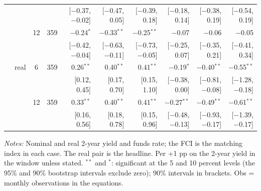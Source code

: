 \begin{longtable}{llcrrrrrrr}
 & & & & {\scriptsize [$-$0.37, $-$0.02]} & {\scriptsize [$-$0.47, 0.05]} & {\scriptsize [$-$0.39, 0.18]} & {\scriptsize [$-$0.18, 0.14]} & {\scriptsize [$-$0.38, 0.19]} & {\scriptsize [$-$0.54, 0.19]}\\
 &  & 12 & 359 & $-$0.24$^{*}$ & $-$0.33$^{**}$ & $-$0.25$^{**}$ & $-$0.07 & $-$0.06 & $-$0.05\\
 & & & & {\scriptsize [$-$0.42, $-$0.04]} & {\scriptsize [$-$0.63, $-$0.11]} & {\scriptsize [$-$0.73, $-$0.05]} & {\scriptsize [$-$0.25, 0.07]} & {\scriptsize [$-$0.35, 0.21]} & {\scriptsize [$-$0.41, 0.34]}\\
 & real & 6 & 359 & 0.26$^{**}$ & 0.40$^{**}$ & 0.41$^{**}$ & $-$0.19$^{*}$ & $-$0.40$^{**}$ & $-$0.55$^{**}$\\
 & & & & {\scriptsize [0.12, 0.45]} & {\scriptsize [0.17, 0.70]} & {\scriptsize [0.15, 1.10]} & {\scriptsize [$-$0.38, 0.00]} & {\scriptsize [$-$0.81, $-$0.08]} & {\scriptsize [$-$1.28, $-$0.18]}\\
 &  & 12 & 359 & 0.33$^{**}$ & 0.40$^{**}$ & 0.41$^{**}$ & $-$0.27$^{**}$ & $-$0.49$^{**}$ & $-$0.61$^{**}$\\
 & & & & {\scriptsize [0.16, 0.56]} & {\scriptsize [0.18, 0.78]} & {\scriptsize [0.15, 0.96]} & {\scriptsize [$-$0.48, $-$0.13]} & {\scriptsize [$-$0.93, $-$0.17]} & {\scriptsize [$-$1.39, $-$0.17]}\\
\end{longtable}
\begin{flushleft}\footnotesize\textit{Notes:} Nominal and real 2-year yield and funds rate; the FCI is the matching index in each case. The real pair is the headline. Per +1 pp on the 2-year yield in the window unless stated. $^{**}$ and $^{*}$: significant at the 5 and 10 percent levels (the 95\% and 90\% bootstrap intervals exclude zero); 90\% intervals in brackets. Obs = monthly observations in the equations.\end{flushleft}
\endgroup
